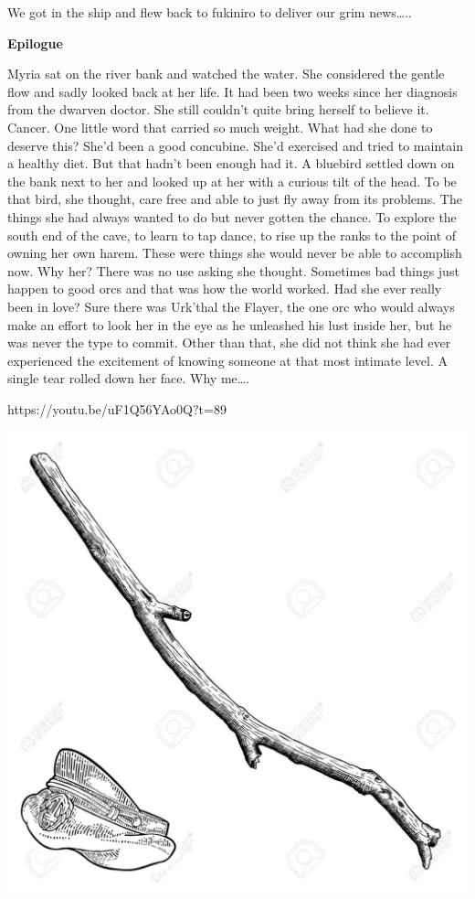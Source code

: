 We got in the ship and flew back to fukiniro to deliver our grim news…..\medskip

\textbf{Epilogue}\medskip

Myria sat on the river bank and watched the water. She considered the gentle flow and sadly looked back at her life. It had been two weeks since her diagnosis from the dwarven doctor. She still couldn’t quite bring herself to believe it. Cancer. One little word that carried so much weight. What had she done to deserve this? She’d been a good concubine. She’d exercised and tried to maintain a healthy diet. But that hadn’t been enough had it. A bluebird settled down on the bank next to her and looked up at her with a curious tilt of the head. To be that bird, she thought, care free and able to just fly away from its problems. The things she had always wanted to do but never gotten the chance. To explore the south end of the cave, to learn to tap dance, to rise up the ranks to the point of owning her own harem. These were things she would never be able to accomplish now. Why her? There was no use asking she thought. Sometimes bad things just happen to good orcs and that was how the world worked. Had she ever really been in love? Sure there was Urk’thal the Flayer, the one orc who would always make an effort to look her in the eye as he unleashed his lust inside her, but he was never the type to commit. Other than that, she did not think she had ever experienced the excitement of knowing someone at that most intimate level. A single tear rolled down her face. Why me….\medskip

https://youtu.be/uF1Q56YAo0Q?t=89\medskip





\vspace*{5mm}

\begin{center}
\includegraphics[width=\textwidth]{./content/img/xxx.jpg}
\begin{figure}[h]
\end{figure}
\end{center}

\clearpage